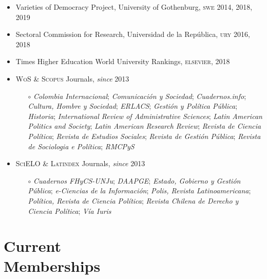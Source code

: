 \documentclass[letterpaper,margin]{res}
\begin{document}
\begin{resume}
\begin{itemize}
\item{\small Varieties of Democracy Project, University of Gothenburg, {\scshape swe} 2014, 2018, 2019}
\item{\small Sectoral Commission for Research, Universidad de la Rep\'ublica, {\scshape ury} 2016, 2018}
\item{\small Times Higher Education World University Rankings, {\scshape elsevier}, 2018}
\item{\small {\scshape WoS} \& {\scshape Scopus} Journals, {\itshape since} 2013}
\begin{itemize}
\item[$\circ$]{\small {\itshape Colombia Internacional}; {\itshape Comunicaci\'on y Sociedad}; {\itshape Cuadernos.info}; {\itshape Cultura, Hombre y Sociedad}; {\itshape ERLACS}; {\itshape Gesti\'on y Pol\'itica P\'ublica}; {\itshape Historia}; {\itshape International Review of Administrative Sciences}; {\itshape Latin American Politics and Society}; {\itshape Latin American Research Review}; {\itshape Revista de Ciencia Pol\'itica}; {\itshape Revista de Estudios Sociales}; {\itshape Revista de Gesti\'on P\'ublica}; {\itshape Revista de Sociologia e Pol\'itica}; {\itshape RMCPyS}}
\end{itemize}
\item{\small {\scshape SciELO} \& {\scshape Latindex} Journals, {\itshape since} 2013}
\begin{itemize}
\item[$\circ$]{\small {\itshape Cuadernos FHyCS-UNJu}; {\itshape DAAPGE}; {\itshape Estado, Gobierno y Gesti\'on P\'ublica}; {\itshape e-Ciencias de la Informaci\'on}; {\itshape Polis, Revista Latinoamericana}; {\itshape Pol\'itica, Revista de Ciencia Pol\'itica}; {\itshape Revista Chilena de Derecho y Ciencia Pol\'itica}; {\itshape V\'ia Iuris}}
\end{itemize}
\end{itemize}


\section{\footnotesize Current \\ Memberships}


\end{resume}
\end{document}
